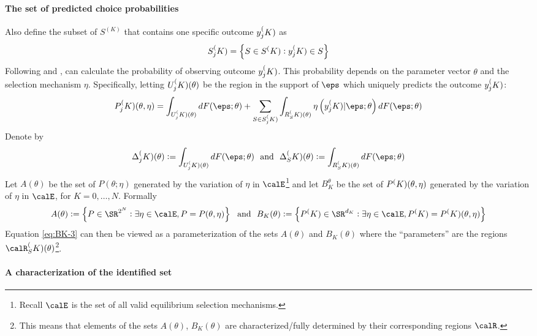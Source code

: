 \paragraph{The set of predicted choice probabilities} Also define the subset of $S^{(K)}$ that contains one specific outcome $y_j^(K)$ as 
\[S_j^(K) = \left\{S\in S^(K) : y_j^(K) \in S\right\}\]
Following \citet{BT-2007} and \citet{GH-2011}, can calculate the probability of observing outcome $y_j^(K)$. This probability depends on the parameter vector $\theta$ and the selection mechanism $\eta$. Specifically, letting $U_j^(K)(\theta)$ be the region in the support of $\eps$ which uniquely predicts the outcome $y_j^(K)$:
\begin{equation}
	\label{eq:BK-3}
	P_j^\PK(\theta,\eta) = \int_{U_j^\PK(\theta)} dF(\eps;\theta) + \sum_{S\in S_j^\PK} \int_{R_S^\PK(\theta)} \eta\left(y_j^\PK|\eps;\theta\right) dF(\eps;\theta)
\end{equation}
Denote by 
\[\Delta_j^\PK(\theta) :=\int_{U_j^\PK(\theta)} dF(\eps;\theta)\andbox \Delta_S^\PK(\theta) := \int_{R_S^\PK(\theta)} dF(\eps;\theta)\]
Let $A(\theta)$ be the set of $P(\theta;\eta)$ generated by the variation of $\eta$ in $\calE$\footnote{Recall \(\calE\) is the set of all valid equilibrium selection mechanisms.} and let $B_K^\theta$ be the set of $P^(K)(\theta, \eta)$ generated by the variation of $\eta$ in $\calE$, for $K = 0,\dots,N$. Formally
\[A(\theta):= \left\{P\in\SR^{2^N}: \exists \eta \in \calE, P = P(\theta,\eta)\right\} \andbox B_K(\theta) := \left\{P^\PK\in \SR^{d_K}: \exists \eta \in \calE, P^\PK = P^\PK(\theta, \eta) \right\}\]
Equation \ref{eq:BK-3} can then be viewed as a parameterization of the sets $A(\theta)$ and $B_K(\theta)$ where the ``parameters'' are the regions $\calR_S^\PK(\theta)$\footnote{This means that elements of the sets $A(\theta)$, $B_K(\theta)$ are characterized/fully determined by their corresponding regions $\calR$.}.

\paragraph{A characterization of the identified set} 

